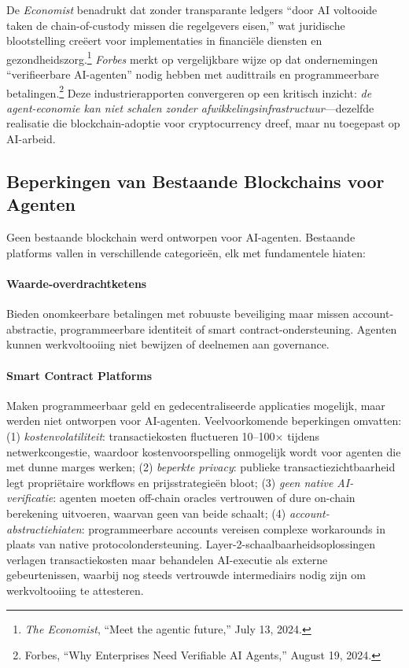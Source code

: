 \documentclass[11pt]{article}
\begin{document}
De \emph{Economist} benadrukt dat zonder transparante ledgers ``door AI voltooide taken de chain-of-custody missen die regelgevers eisen,'' wat juridische blootstelling creëert voor implementaties in financiële diensten en gezondheidszorg.\footnote{\emph{The Economist}, ``Meet the agentic future,'' July 13, 2024.} \emph{Forbes} merkt op vergelijkbare wijze op dat ondernemingen ``verifieerbare AI-agenten'' nodig hebben met audittrails en programmeerbare betalingen.\footnote{Forbes, ``Why Enterprises Need Verifiable AI Agents,'' August 19, 2024.} Deze industrierapporten convergeren op een kritisch inzicht: \emph{de agent-economie kan niet schalen zonder afwikkelingsinfrastructuur}---dezelfde realisatie die blockchain-adoptie voor cryptocurrency dreef, maar nu toegepast op AI-arbeid.

\subsection{Beperkingen van Bestaande Blockchains voor Agenten}
Geen bestaande blockchain werd ontworpen voor AI-agenten. Bestaande platforms vallen in verschillende categorieën, elk met fundamentele hiaten:

\paragraph{Waarde-overdrachtketens} Bieden onomkeerbare betalingen met robuuste beveiliging maar missen account-abstractie, programmeerbare identiteit of smart contract-ondersteuning. Agenten kunnen werkvoltooiing niet bewijzen of deelnemen aan governance.

\paragraph{Smart Contract Platforms} Maken programmeerbaar geld en gedecentraliseerde applicaties mogelijk, maar werden niet ontworpen voor AI-agenten. Veelvoorkomende beperkingen omvatten: (1) \emph{kostenvolatiliteit}: transactiekosten fluctueren 10--100$\times$ tijdens netwerkcongestie, waardoor kostenvoorspelling onmogelijk wordt voor agenten die met dunne marges werken; (2) \emph{beperkte privacy}: publieke transactiezichtbaarheid legt propriëtaire workflows en prijsstrategieën bloot; (3) \emph{geen native AI-verificatie}: agenten moeten off-chain oracles vertrouwen of dure on-chain berekening uitvoeren, waarvan geen van beide schaalt; (4) \emph{account-abstractiehiaten}: programmeerbare accounts vereisen complexe workarounds in plaats van native protocolondersteuning. Layer-2-schaalbaarheidsoplossingen verlagen transactiekosten maar behandelen AI-executie als externe gebeurtenissen, waarbij nog steeds vertrouwde intermediairs nodig zijn om werkvoltooiing te attesteren.
\end{document}
